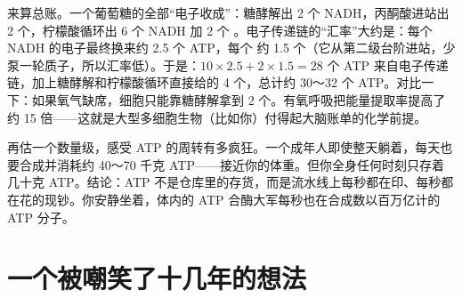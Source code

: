 \begin{qiaoliang}
来算总账。一个葡萄糖的全部“电子收成”：糖酵解出 2 个 NADH，丙酮酸进站出 2 个，柠檬酸循环出 6 个 NADH 加 2 个 。电子传递链的“汇率”大约是：每个 NADH 的电子最终换来约 2.5 个 ATP，每个  约 1.5 个（它从第二级台阶进站，少泵一轮质子，所以汇率低）。于是：$10\times 2.5 + 2\times 1.5 = 28$ 个 ATP 来自电子传递链，加上糖酵解和柠檬酸循环直接给的 4 个，总计约 30～32 个 ATP。对比一下：如果氧气缺席，细胞只能靠糖酵解拿到 2 个。有氧呼吸把能量提取率提高了约 15 倍——这就是大型多细胞生物（比如你）付得起大脑账单的化学前提。

再估一个数量级，感受 ATP 的周转有多疯狂。一个成年人即使整天躺着，每天也要合成并消耗约 40～70 千克 ATP——接近你的体重。但你全身任何时刻只存着几十克 ATP。结论：ATP 不是仓库里的存货，而是流水线上每秒都在印、每秒都在花的现钞。你安静坐着，体内的 ATP 合酶大军每秒也在合成数以百万亿计的 ATP 分子。
\end{qiaoliang}

\section{一个被嘲笑了十几年的想法}

